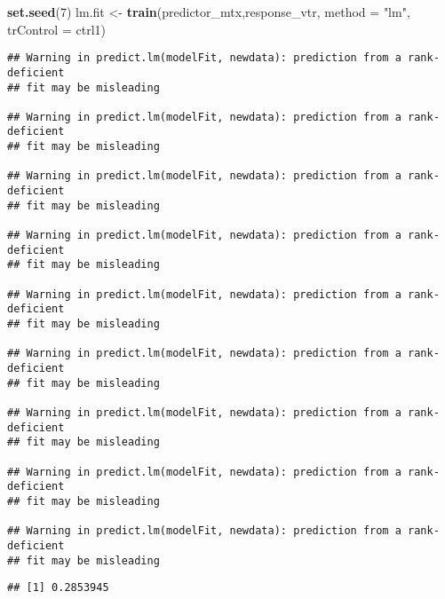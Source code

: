 \documentclass[]{article}
\newenvironment{Shaded}{\begin{snugshade}}{\end{snugshade}}
\newcommand{\DataTypeTok}[1]{\textcolor[rgb]{0.13,0.29,0.53}{#1}}
\newcommand{\DecValTok}[1]{\textcolor[rgb]{0.00,0.00,0.81}{#1}}
\newcommand{\KeywordTok}[1]{\textcolor[rgb]{0.13,0.29,0.53}{\textbf{#1}}}
\newcommand{\NormalTok}[1]{#1}
\newcommand{\OperatorTok}[1]{\textcolor[rgb]{0.81,0.36,0.00}{\textbf{#1}}}
\newcommand{\StringTok}[1]{\textcolor[rgb]{0.31,0.60,0.02}{#1}}
\begin{document}
\begin{Shaded}
\begin{Highlighting}[]
\KeywordTok{set.seed}\NormalTok{(}\DecValTok{7}\NormalTok{)}
\NormalTok{lm.fit <-}\StringTok{ }\KeywordTok{train}\NormalTok{(predictor_mtx,response_vtr,}
                \DataTypeTok{method =} \StringTok{"lm"}\NormalTok{,}
                \DataTypeTok{trControl =}\NormalTok{ ctrl1)}
\end{Highlighting}
\end{Shaded}

\begin{verbatim}
## Warning in predict.lm(modelFit, newdata): prediction from a rank-deficient
## fit may be misleading

## Warning in predict.lm(modelFit, newdata): prediction from a rank-deficient
## fit may be misleading

## Warning in predict.lm(modelFit, newdata): prediction from a rank-deficient
## fit may be misleading

## Warning in predict.lm(modelFit, newdata): prediction from a rank-deficient
## fit may be misleading

## Warning in predict.lm(modelFit, newdata): prediction from a rank-deficient
## fit may be misleading

## Warning in predict.lm(modelFit, newdata): prediction from a rank-deficient
## fit may be misleading

## Warning in predict.lm(modelFit, newdata): prediction from a rank-deficient
## fit may be misleading

## Warning in predict.lm(modelFit, newdata): prediction from a rank-deficient
## fit may be misleading

## Warning in predict.lm(modelFit, newdata): prediction from a rank-deficient
## fit may be misleading
\end{verbatim}

\begin{Shaded}
\end{Shaded}

\begin{verbatim}
## [1] 0.2853945
\end{verbatim}
\end{document}
